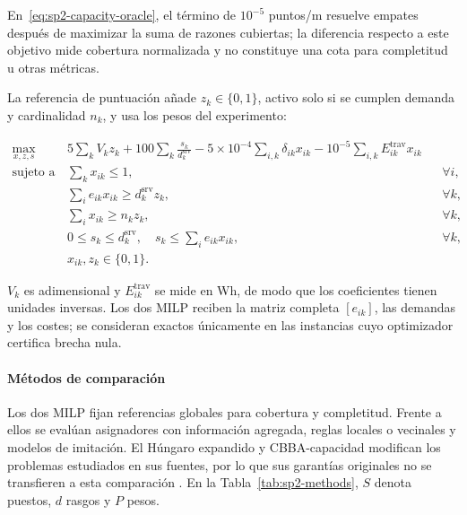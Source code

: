 En~\eqref{eq:sp2-capacity-oracle}, el término de $10^{-5}$ puntos/m resuelve empates después de maximizar la suma de razones cubiertas; la diferencia respecto a este objetivo mide cobertura normalizada y no constituye una cota para completitud u otras métricas.

La referencia de puntuación añade $z_k\in\{0, 1\}$, activo solo si se cumplen demanda y cardinalidad $n_k$, y usa los pesos del experimento:

\begin{equation}
\label{eq:sp2-score-oracle}
\begin{aligned}
  \max_{x,z,s}\quad
  & 5\sum_k V_kz_k
    +100\sum_k\frac{s_k}{d_k^{\mathrm{srv}}}
    -5\times10^{-4}\sum_{i,k}\delta_{ik}x_{ik}
    -10^{-5}\sum_{i,k}E_{ik}^{\mathrm{trav}}x_{ik} \\
  \text{sujeto a}\quad
  & \sum_kx_{ik}\leq1, && \forall i,\\
  & \sum_i e_{ik}x_{ik}\geq d_k^{\mathrm{srv}}z_k, && \forall k,\\
  & \sum_i x_{ik}\geq n_kz_k, && \forall k,\\
  & 0\leq s_k\leq d_k^{\mathrm{srv}},\quad s_k\leq\sum_i e_{ik}x_{ik}, && \forall k,\\
  & x_{ik},z_k\in\{0, 1\}. &&
\end{aligned}
\end{equation}

$V_k$ es adimensional y $E_{ik}^{\mathrm{trav}}$ se mide en Wh, de modo que los coeficientes tienen unidades inversas. Los dos MILP reciben la matriz completa $[e_{ik}]$, las demandas y los costes; se consideran exactos únicamente en las instancias cuyo optimizador certifica brecha nula.

\paragraph{Métodos de comparación}

Los dos MILP fijan referencias globales para cobertura y completitud. Frente a ellos se evalúan asignadores con información agregada, reglas locales o vecinales y modelos de imitación. El Húngaro expandido y CBBA-capacidad modifican los problemas estudiados en sus fuentes, por lo que sus garantías originales no se transfieren a esta comparación \parencite{kuhn1955Hungarian,choiBrunetHow2009CBBA}. En la Tabla~\ref{tab:sp2-methods}, $S$ denota puestos, $d$ rasgos y $P$ pesos.

